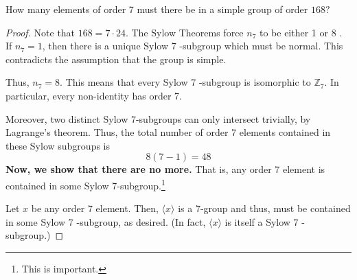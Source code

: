 \begin{exercise}
How many elements of order 7 must there be in a simple group of order $168 ?$
\end{exercise}
\begin{proof}
Note that $168=7 \cdot 24$. The Sylow Theorems force $n_7$ to be either 1 or 8 . If $n_7=1$, then there is a unique Sylow 7 -subgroup which must be normal. This contradicts the assumption that the group is simple.

Thus, $n_7=8$. This means that every Sylow 7 -subgroup is isomorphic to $\mathbb{Z}_7$. In particular, every non-identity has order 7.

Moreover, two distinct Sylow 7-subgroups can only intersect trivially, by Lagrange's theorem. Thus, the total number of order 7 elements contained in these Sylow subgroups is
\[
8(7-1)=48
\]
\textbf{Now, we show that there are no more.} That is, any order 7 element is contained in some Sylow 7-subgroup.\footnote{This is important.}

Let $x$ be any order 7 element. Then, $\langle x\rangle$ is a 7-group and thus, must be contained in some Sylow 7 -subgroup, as desired. (In fact, $\langle x\rangle$ is itself a Sylow 7 -subgroup.)
\end{proof}

